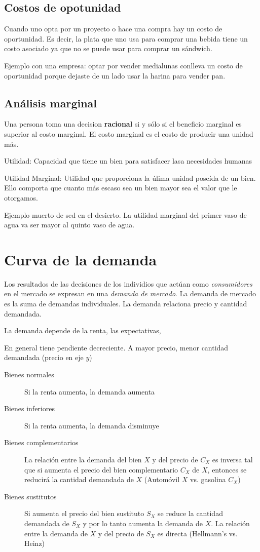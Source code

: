 \documentclass[twocolumn,10pt]{article}
\begin{document}
\subsection{Costos de opotunidad}

Cuando uno opta por un proyecto o hace una compra hay un costo de oportunidad. Es decir, la plata que uno usa para comprar una bebida tiene un costo asociado ya que no se puede usar para comprar un sándwich.

Ejemplo con una empresa: optar por vender medialunas conlleva un costo de oportunidad porque dejaste de un lado usar la harina para vender pan.

\subsection{An\'alisis marginal}
Una persona toma una decision \textbf{racional} si y s\'olo si el beneficio marginal es superior al costo marginal. El costo marginal es el costo de producir una unidad m\'as.

Utilidad: Capacidad que tiene un bien para satisfacer lasa necesidades humanas

Utilidad Marginal: Utilidad que proporciona la \'ulima unidad pose\'ida de un bien. Ello comporta que cuanto m\'as escaso sea un bien mayor sea el valor que le otorgamos. 

Ejemplo muerto de sed en el desierto. La utilidad marginal del primer vaso de agua va ser mayor al quinto vaso de agua.
\section{Curva de la demanda}
Los resultados de las decisiones de los individios que act\'uan como \textit{consumidores} en el mercado se expresan en una \textit{demanda de mercado}. La demanda de mercado es la suma de demandas individuales. La demanda relaciona precio y cantidad demandada.

La demanda depende de la renta, las expectativas,

En general tiene pendiente decreciente. A mayor precio, menor cantidad demandada (precio en eje $y$)
\begin{description}
	\item[Bienes normales] Si la renta aumenta, la demanda aumenta
	\item[Bienes inferiores] Si la renta aumenta, la demanda disminuye
	\item[Bienes complementarios] La relación entre la demanda del bien $X$ y del precio de $C_X$ es inversa tal que si aumenta el precio del bien complementario $C_X$ de $X$, entonces se reducirá la cantidad demandada de $X$ (Automóvil $X$ vs. gasolina $C_X$)
	\item[Bienes sustitutos] Si aumenta el precio del bien sustituto $S_X$ se reduce la cantidad demandada de $S_X$ y por lo tanto aumenta la demanda de $X$. La relación entre la demanda de $X$ y del precio de $S_X$ es directa (Hellmann's vs. Heinz) 
\end{description}
\end{document}
